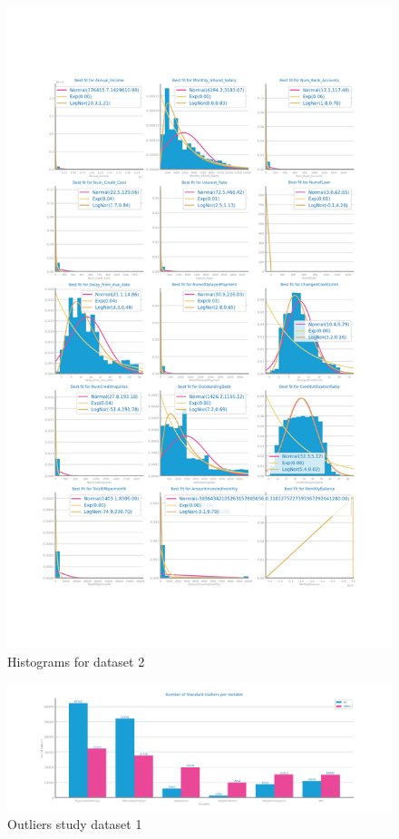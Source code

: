 \documentclass[10pt]{extarticle}
\begin{document}
\begin{figure}[H]
\centering\includegraphics[scale=0.4]{images/dataset2/data_profiling/Credit_Score_histogram_numeric_distribution.png}
\caption{Histograms for dataset 2} %
\end{figure}

\begin{figure}[H]
\centering\includegraphics[scale=0.60]{images/dataset1/data_profiling/CovidPos_outliers_standard.png}
\caption{Outliers study dataset 1}
\end{figure}
\end{document}
